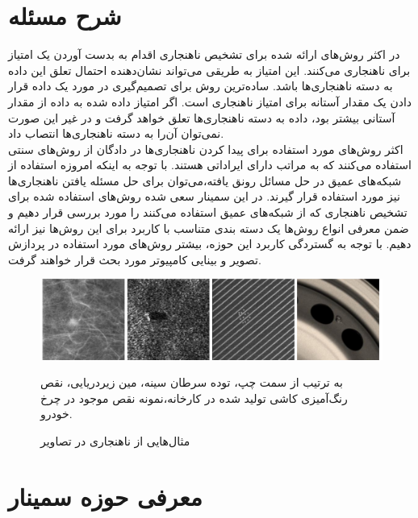 \documentclass[12pt,a4paper]{report}
\theoremstyle{definition}
\theoremstyle{theorem}
\theoremstyle{definition}
\begin{document}
	\section{شرح مسئله}

   
در اکثر روش‌های ارائه شده برای تشخیص ناهنجاری اقدام به بدست آوردن یک امتیاز برای ناهنجاری می‌کنند. این امتیاز به طریقی می‌تواند نشان‌‌دهنده احتمال تعلق این داده به دسته ناهنجاری‌ها باشد. ساده‌ترین روش برای تصمیم‌گیری در مورد یک داده قرار دادن یک مقدار آستانه برای امتیاز ناهنجاری است. اگر امتیاز داده شده به داده از مقدار آستانی بیشتر بود، داده به دسته ناهنجاری‌ها تعلق خواهد گرفت و در غیر این صورت نمی‌توان آن‌را به دسته ناهنجاری‌ها انتصاب داد.\\

اکثر روش‌های مورد استفاده برای پیدا کردن ناهنجاری‌ها در دادگان از روش‌های سنتی استفاده می‌کنند که به مراتب دارای ایراداتی هستند. با توجه به اینکه امروزه استفاده از شبکه‌های عمیق در حل مسائل رونق یافته،‌می‌توان برای حل مسئله یافتن ناهنجاری‌‌ها نیز مورد استفاده قرار گیرند. در این سمینار سعی شده روش‌های استفاده شده برای تشخیص ناهنجاری که از شبکه‌های عمیق استفاده می‌کنند را مورد بررسی قرار دهیم و ضمن معرفی انواع روش‌ها یک دسته بندی متناسب با کاربرد برای این روش‌ها نیز ارائه دهیم. با توجه به گستردگی کاربرد این حوزه، بیشتر روش‌های مورد استفاده در پردازش تصویر و بینایی کامپیوتر مورد بحث قرار خواهند گرفت.


\begin{figure}[hp]
	\begin{center}
		\includegraphics[width=\linewidth]{./images/figures/image-anomaly-examples-1.png}
		\caption*{به ترتیب از سمت چپ، توده سرطان سینه، مین زیر‌دریایی، نقص رنگ‌آمیزی کاشی تولید شده در کارخانه،نمونه نقص موجود در چرخ خودرو.}
		\caption{
		مثال‌هایی از ناهنجاری در تصاویر
		\cite{T.Ehret}
		}		
		\label{fig:anomaly-example-1}
		\centering
	\end{center}
\end{figure}




	\section{معرفی حوزه سمینار}
\end{document}
